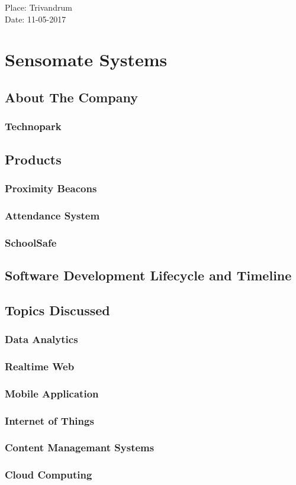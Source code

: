 \documentclass[a4paper,12pt]{report}
\begin{document}
\begin{titlepage}
		\begin{flushleft}
		Place: Trivandrum\\
		Date:  11-05-2017\\
		\end{flushleft}
		\vfill %
	\end{titlepage}

	
	\newpage
	\tableofcontents
	\newpage

	\chapter{Sensomate Systems}
		\section{About The Company}
			\subsection{Technopark}
		\section{Products}
			\subsection{Proximity Beacons}
			\subsection{Attendance System}
			\subsection{SchoolSafe}
		\section{Software Development Lifecycle and Timeline}
		\section{Topics Discussed}
			\subsection{Data Analytics}
			\subsection{Realtime Web}
			\subsection{Mobile Application}
			\subsection{Internet of Things}
			\subsection{Content Managemant Systems}
			\subsection{Cloud Computing}
	
\end{document}
